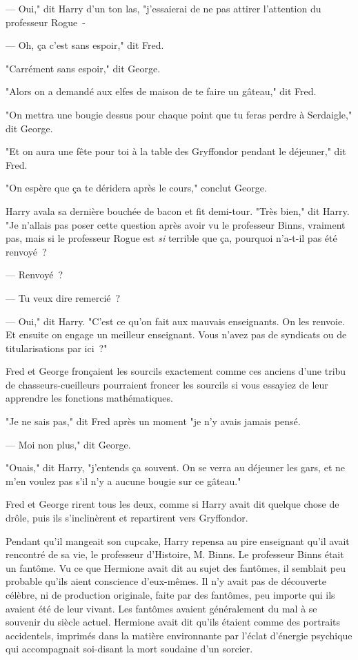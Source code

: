 --- Oui," dit Harry d'un ton las, "j'essaierai de ne pas attirer l'attention du professeur Rogue~-

--- Oh, ça c'est sans espoir," dit Fred.

"Carrément sans espoir," dit George.

"Alors on a demandé aux elfes de maison de te faire un gâteau," dit Fred.

"On mettra une bougie dessus pour chaque point que tu feras perdre à Serdaigle," dit George.

"Et on aura une fête pour toi à la table des Gryffondor pendant le déjeuner," dit Fred.

"On espère que ça te déridera après le cours," conclut George.

Harry avala sa dernière bouchée de bacon et fit demi-tour. "Très bien," dit Harry. "Je n'allais pas poser cette question après avoir vu le professeur Binns, vraiment pas, mais si le professeur Rogue est \emph{si} terrible que ça, pourquoi n'a-t-il pas été renvoyé~?

--- Renvoyé~?

--- Tu veux dire remercié~?

--- Oui," dit Harry. "C'est ce qu'on fait aux mauvais enseignants. On les renvoie. Et ensuite on engage un meilleur enseignant. Vous n'avez pas de syndicats ou de titularisations par ici~?"

Fred et George fronçaient les sourcils exactement comme ces anciens d'une tribu de chasseurs-cueilleurs pourraient froncer les sourcils si vous essayiez de leur apprendre les fonctions mathématiques.

"Je ne sais pas," dit Fred après un moment "je n'y avais jamais pensé.

--- Moi non plus," dit George.

"Ouais," dit Harry, "j'entends ça souvent. On se verra au déjeuner les gars, et ne m'en voulez pas s'il n'y a aucune bougie sur ce gâteau."

Fred et George rirent tous les deux, comme si Harry avait dit quelque chose de drôle, puis ils s'inclinèrent et repartirent vers Gryffondor.

Pendant qu'il mangeait son cupcake, Harry repensa au pire enseignant qu'il avait rencontré de sa vie, le professeur d'Histoire, M. Binns. Le professeur Binns était un fantôme. Vu ce que Hermione avait dit au sujet des fantômes, il semblait peu probable qu'ils aient conscience d'eux-mêmes. Il n'y avait pas de découverte célèbre, ni de production originale, faite par des fantômes, peu importe qui ils avaient été de leur vivant. Les fantômes avaient généralement du mal à se souvenir du siècle actuel. Hermione avait dit qu'ils étaient comme des portraits accidentels, imprimés dans la matière environnante par l'éclat d'énergie psychique qui accompagnait soi-disant la mort soudaine d'un sorcier.

